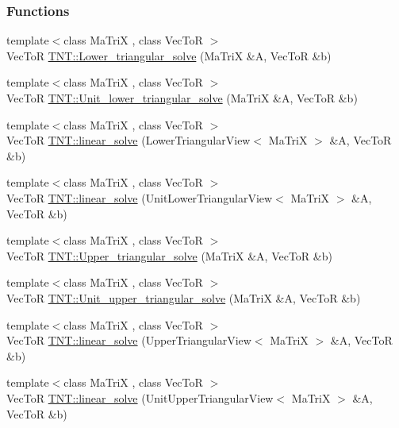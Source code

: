 \subsubsection*{Functions}
\begin{DoxyCompactItemize}
\item 
{\footnotesize template$<$class MaTriX , class VecToR $>$ }\\VecToR \hyperlink{namespace_t_n_t_a93cf98206fa641a7189ae4aa03fa7c5e}{TNT::Lower\_\-triangular\_\-solve} (MaTriX \&A, VecToR \&b)
\item 
{\footnotesize template$<$class MaTriX , class VecToR $>$ }\\VecToR \hyperlink{namespace_t_n_t_a17e216ba2b0960d02573466e564f54e7}{TNT::Unit\_\-lower\_\-triangular\_\-solve} (MaTriX \&A, VecToR \&b)
\item 
{\footnotesize template$<$class MaTriX , class VecToR $>$ }\\VecToR \hyperlink{namespace_t_n_t_a20a470aed088e9c73fcc7a273cec9425}{TNT::linear\_\-solve} (LowerTriangularView$<$ MaTriX $>$ \&A, VecToR \&b)
\item 
{\footnotesize template$<$class MaTriX , class VecToR $>$ }\\VecToR \hyperlink{namespace_t_n_t_a745c446330527defb7f4fedc086b0c65}{TNT::linear\_\-solve} (UnitLowerTriangularView$<$ MaTriX $>$ \&A, VecToR \&b)
\item 
{\footnotesize template$<$class MaTriX , class VecToR $>$ }\\VecToR \hyperlink{namespace_t_n_t_a04eefd4672398e54eb288413564a59e3}{TNT::Upper\_\-triangular\_\-solve} (MaTriX \&A, VecToR \&b)
\item 
{\footnotesize template$<$class MaTriX , class VecToR $>$ }\\VecToR \hyperlink{namespace_t_n_t_ab74dbcd7549f5677e791ef40bbb28e5e}{TNT::Unit\_\-upper\_\-triangular\_\-solve} (MaTriX \&A, VecToR \&b)
\item 
{\footnotesize template$<$class MaTriX , class VecToR $>$ }\\VecToR \hyperlink{namespace_t_n_t_a4d7d5a1d9679310cb1b6df7c3d57135f}{TNT::linear\_\-solve} (UpperTriangularView$<$ MaTriX $>$ \&A, VecToR \&b)
\item 
{\footnotesize template$<$class MaTriX , class VecToR $>$ }\\VecToR \hyperlink{namespace_t_n_t_a59966684c146cdad2eafe07c62922354}{TNT::linear\_\-solve} (UnitUpperTriangularView$<$ MaTriX $>$ \&A, VecToR \&b)
\end{DoxyCompactItemize}
